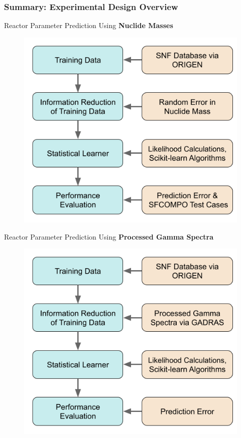 
\begin{frame}
  \frametitle{Summary: Experimental Design Overview}
  \begin{adjustwidth}{-10pt}{-10pt}
  \begin{minipage}{0.5\textwidth}
    \begin{block}{Reactor Parameter Prediction Using \textbf{Nuclide Masses}}
      \begin{figure}
        \centering
        \includegraphics[width=\textwidth]{./figures/methodology1.png}
      \end{figure}
    \end{block}
  \end{minipage}%
  \hfill
  \begin{minipage}{0.5\textwidth}
    \begin{block}{Reactor Parameter Prediction Using \textbf{Processed Gamma Spectra}}
      \begin{figure}
        \centering
        \includegraphics[width=\textwidth]{./figures/methodology2.png}

\end{figure}
\end{block}
\end{minipage}
\end{adjustwidth}
\end{frame}
